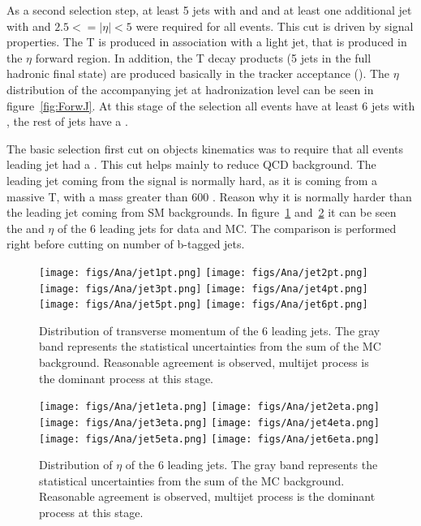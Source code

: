 As a second selection step, at least 5 jets with  and  and at least one additional jet with  and $2.5<=|\eta|<5$ were required for all events. This cut is driven by signal properties. The T is produced in association with a light jet, that is produced in the $\eta$ forward region. In addition, the T decay products (5 jets in the full hadronic final state) are produced basically in the tracker acceptance (). The $\eta$ distribution of the accompanying jet at hadronization level can be seen in figure~\ref{fig:ForwJ}. At this stage of the selection all events have at least 6 jets with , the rest of jets have a . %

The basic selection first cut on objects kinematics was to require that all events leading jet had a . This cut helps mainly to reduce QCD background. The leading jet coming from the signal is normally hard, as it is coming from a massive T, with a mass greater than 600 \GeVcc. Reason why it is normally harder than the leading jet coming from SM backgrounds. In figure~\ref{fig:6jpt} and~\ref{fig:6jeta} it can be seen the \pt and $\eta$ of the 6 leading jets for data and MC. The comparison is performed right before cutting on number of b-tagged jets.

\begin{figure}[!Hhtbp]
  \begin{center}
    \texttt{[image: figs/Ana/jet1pt.png]}
    \texttt{[image: figs/Ana/jet2pt.png]}
    \texttt{[image: figs/Ana/jet3pt.png]}
    \texttt{[image: figs/Ana/jet4pt.png]}
    \texttt{[image: figs/Ana/jet5pt.png]}
    \texttt{[image: figs/Ana/jet6pt.png]}
    \caption{Distribution of transverse momentum of the 6 leading jets. The gray band represents the statistical uncertainties from the sum of the MC background. Reasonable agreement is observed, multijet process is the dominant process at this stage.}
    \label{fig:6jpt}
  \end{center}
\end{figure}

\begin{figure}[!Hhtbp]
  \begin{center}
    \texttt{[image: figs/Ana/jet1eta.png]}
    \texttt{[image: figs/Ana/jet2eta.png]}
    \texttt{[image: figs/Ana/jet3eta.png]}
    \texttt{[image: figs/Ana/jet4eta.png]}
    \texttt{[image: figs/Ana/jet5eta.png]}
    \texttt{[image: figs/Ana/jet6eta.png]}
    \caption{Distribution of $\eta$ of the 6 leading jets. The gray band represents the statistical uncertainties from the sum of the MC background. Reasonable agreement is observed, multijet process is the dominant process at this stage.}
    \label{fig:6jeta}
  \end{center}
\end{figure}

